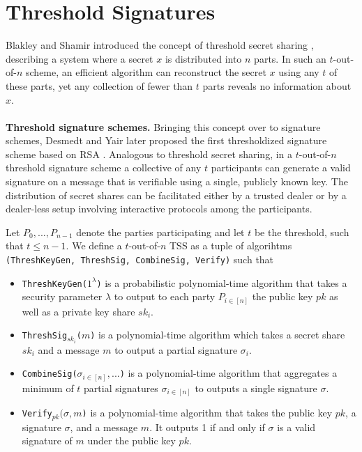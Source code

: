 \section{Threshold Signatures}
\label{prelim:thresholdSignatures}
Blakley and Shamir introduced the concept of threshold secret sharing \cite{blakley1979safeguarding}\cite{shamir1979share}, describing a system where a secret \(x\) is distributed into \(n\) parts. In such an \(t\)-out-of-\(n\) scheme, an efficient algorithm can reconstruct the secret \(x\) using any \(t\) of these parts, yet any collection of fewer than \(t\) parts reveals no information about \(x\).
\\\\
\textbf{Threshold signature schemes.} Bringing this concept over to signature schemes, Desmedt and Yair later proposed the first thresholdized signature scheme based on RSA \cite{desmedt1991shared}. Analogous to threshold secret sharing, in a $t$-out-of-$n$ threshold signature scheme a collective of any $t$ participants can generate a valid signature on a message that is verifiable using a single, publicly known key. The distribution of secret shares can be facilitated either by a trusted dealer or by a dealer-less setup involving interactive protocols among the participants.

\begin{definition}
    \label{def:tss}
    Let $P_0,...,P_{n-1}$ denote the parties participating and let $t$ be the threshold, such that $t \leq n-1$. We define a $t$-out-of-$n$ TSS as a tuple of algorihtms \texttt{\textup{(ThreshKeyGen, ThreshSig, CombineSig, Verify)}} such that
    \begin{itemize}
        \item \texttt{\textup{ThreshKeyGen($1^\lambda$)}} is a probabilistic polynomial-time algorithm that takes a security parameter $\lambda$ to output to each party $P_{i\in [n]}$ the public key $pk$ as well as a private key share $sk_i$.
        \item \texttt{\textup{ThreshSig$_{sk_i}$($m$)}} is a polynomial-time algorithm which takes a secret share $sk_i$ and a message $m$ to output a partial signature $\sigma_i$.
        \item \texttt{\textup{CombineSig($\sigma_{i \in [n]},...$)}} is a polynomial-time algorithm that aggregates a minimum of $t$ partial signatures $\sigma_{i \in [n]}$ to outputs a single signature $\sigma$.
        \item \texttt{\textup{Verify$_{pk}(\sigma, m$)}} is a polynomial-time algorithm that takes the public key $pk$, a signature $\sigma$, and a message $m$. It outputs 1 if and only if $\sigma$ is a valid signature of $m$ under the public key $pk$.
    \end{itemize}
\end{definition}

